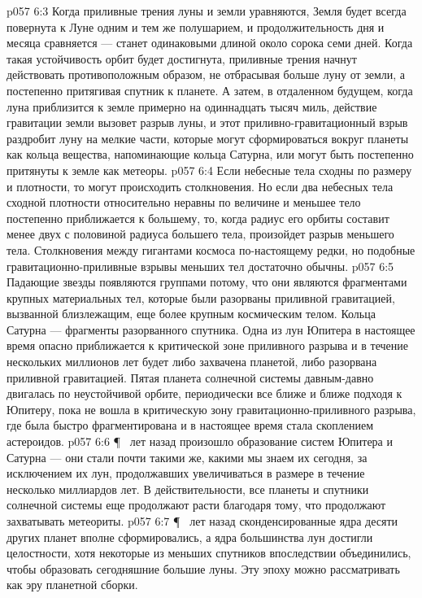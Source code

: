 \vs p057 6:3 Когда приливные трения луны и земли уравняются, Земля будет всегда повернута к Луне одним и тем же полушарием, и продолжительность дня и месяца сравняется --- станет одинаковыми длиной около сорока семи дней. Когда такая устойчивость орбит будет достигнута, приливные трения начнут действовать противоположным образом, не отбрасывая больше луну от земли, а постепенно притягивая спутник к планете. А затем, в отдаленном будущем, когда луна приблизится к земле примерно на одиннадцать тысяч миль, действие гравитации земли вызовет разрыв луны, и этот приливно\hyp{}гравитационный взрыв раздробит луну на мелкие части, которые могут сформироваться вокруг планеты как кольца вещества, напоминающие кольца Сатурна, или могут быть постепенно притянуты к земле как метеоры.
\vs p057 6:4 Если небесные тела сходны по размеру и плотности, то могут происходить столкновения. Но если два небесных тела сходной плотности относительно неравны по величине и меньшее тело постепенно приближается к большему, то, когда радиус его орбиты составит менее двух с половиной радиуса большего тела, произойдет разрыв меньшего тела. Столкновения между гигантами космоса по\hyp{}настоящему редки, но подобные гравитационно\hyp{}приливные взрывы меньших тел достаточно обычны.
\vs p057 6:5 Падающие звезды появляются группами потому, что они являются фрагментами крупных материальных тел, которые были разорваны приливной гравитацией, вызванной близлежащим, еще более крупным космическим телом. Кольца Сатурна --- фрагменты разорванного спутника. Одна из лун Юпитера в настоящее время опасно приближается к критической зоне приливного разрыва и в течение нескольких миллионов лет будет либо захвачена планетой, либо разорвана приливной гравитацией. Пятая планета солнечной системы давным\hyp{}давно двигалась по неустойчивой орбите, периодически все ближе и ближе подходя к Юпитеру, пока не вошла в критическую зону гравитационно\hyp{}приливного разрыва, где была быстро фрагментирована и в настоящее время стала скоплением астероидов.
\vs p057 6:6 \P\  лет назад произошло образование систем Юпитера и Сатурна --- они стали почти такими же, какими мы знаем их сегодня, за исключением их лун, продолжавших увеличиваться в размере в течение несколько миллиардов лет. В действительности, все планеты и спутники солнечной системы еще продолжают расти благодаря тому, что продолжают захватывать метеориты.
\vs p057 6:7 \P\  лет назад сконденсированные ядра десяти других планет вполне сформировались, а ядра большинства лун достигли целостности, хотя некоторые из меньших спутников впоследствии объединились, чтобы образовать сегодняшние большие луны. Эту эпоху можно рассматривать как эру планетной сборки.
